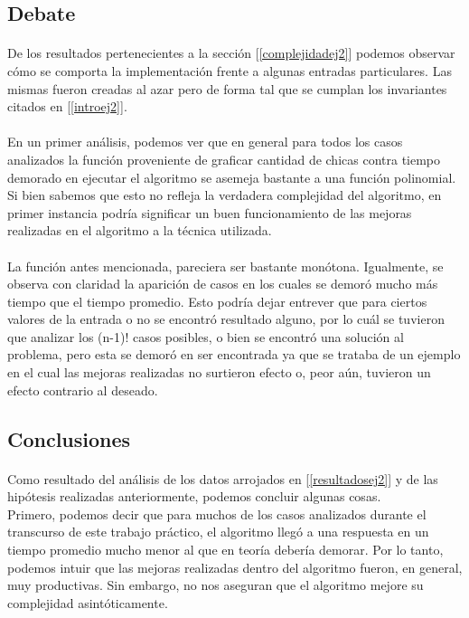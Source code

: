 \subsection{Debate}
\paragraph{}
De los resultados pertenecientes a la sección [\ref{complejidadej2}] podemos observar cómo se comporta la implementación frente a algunas entradas particulares. Las mismas fueron creadas al azar pero de forma tal que se cumplan los invariantes citados en [\ref{introej2}].

\paragraph{}
En un primer análisis, podemos ver que en general para todos los casos analizados la función proveniente de graficar cantidad de chicas contra tiempo demorado en ejecutar el algoritmo se asemeja bastante a una función polinomial. Si bien sabemos que esto no refleja la verdadera complejidad del algoritmo, en primer instancia podría significar un buen funcionamiento de las mejoras realizadas en el algoritmo a la técnica utilizada.

\paragraph{}
La función antes mencionada, pareciera ser bastante monótona. Igualmente, se observa con claridad la aparición de casos en los cuales se demoró mucho más tiempo que el tiempo promedio. Esto podría dejar entrever que para ciertos valores de la entrada o no se encontró resultado alguno, por lo cuál se tuvieron que analizar los (n-1)! casos posibles, o bien se encontró una solución al problema, pero esta se demoró en ser encontrada ya que se trataba de un ejemplo en el cual las mejoras realizadas no surtieron efecto o, peor aún, tuvieron un efecto contrario al deseado.


\subsection{Conclusiones}

\paragraph{}
Como resultado del análisis de los datos arrojados en [\ref{resultadosej2}] y de las hipótesis realizadas anteriormente, podemos concluir algunas cosas.\\
Primero, podemos decir que para muchos de los casos analizados durante el transcurso de este trabajo práctico, el algoritmo llegó a una respuesta en un tiempo promedio mucho menor al que en teoría debería demorar. Por lo tanto, podemos intuir que las mejoras realizadas dentro del algoritmo fueron, en general, muy productivas. Sin embargo, no nos aseguran que el algoritmo mejore su complejidad asintóticamente.


